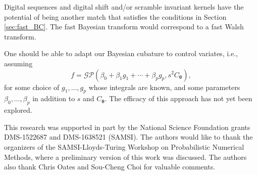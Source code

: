 \documentclass{svjour3}                     %
\newcommand{\bm}[1]{\boldsymbol{#1}}
\newcommand{\vtheta}{{\bm{\theta}}}
\begin{document}
Digital sequences and digital shift and/or scramble invariant kernels have the potential of being another match that satisfies the conditions in Section \ref{sec:fast_BC}.  The fast Bayesian transform would correspond to a fast Walsh transform.  


One should be able to adapt our Bayesian cubature to control variates, i.e., assuming  
\begin{equation*}
f = \mathcal{GP} \left( \beta_0 + \beta_1 g_1 + \cdots + \beta_p g_p, s^2 C_\vtheta \right),
\end{equation*}
for some choice of $g_1, \ldots, g_p$ whose integrals are known, and some parameters $\beta_0, \ldots, \beta_p$ in addition to $s$ and $C_\vtheta$.  The efficacy of this approach has not yet been explored.













\begin{acknowledgements}
This research was supported in part by the National Science Foundation grants DMS-1522687 and DMS-1638521 (SAMSI).
The authors would like to thank the organizers of the SAMSI-Lloyds-Turing Workshop on Probabilistic Numerical Methods, where a preliminary version of this work was discussed.  The authors also thank Chris Oates and Sou-Cheng Choi for valuable comments.
\end{acknowledgements}



\end{document}
